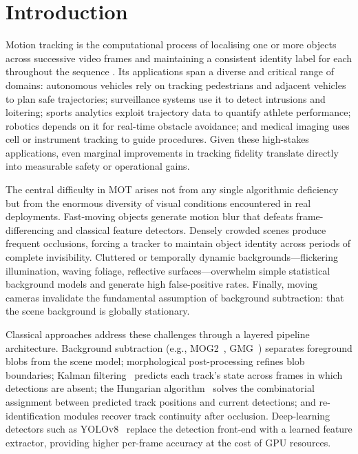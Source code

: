 \documentclass[10pt, conference, compsocconf]{IEEEtran}
\begin{document}
\section{Introduction}

Motion tracking is the computational process of localising one or
more objects across successive video frames and maintaining a
consistent identity label for each throughout the sequence
\cite{smeulders2014}. Its applications span a diverse and
critical range of domains: autonomous vehicles rely on tracking
pedestrians and adjacent vehicles to plan safe trajectories;
surveillance systems use it to detect intrusions and loitering;
sports analytics exploit trajectory data to quantify athlete
performance; robotics depends on it for real-time obstacle avoidance;
and medical imaging uses cell or instrument tracking to guide
procedures. Given these high-stakes applications, even marginal
improvements in tracking fidelity translate directly into measurable
safety or operational gains.

The central difficulty in MOT arises not from any single algorithmic
deficiency but from the enormous diversity of visual conditions
encountered in real deployments. Fast-moving objects generate motion
blur that defeats frame-differencing and classical feature detectors.
Densely crowded scenes produce frequent occlusions, forcing a tracker
to maintain object identity across periods of complete invisibility.
Cluttered or temporally dynamic backgrounds---flickering illumination,
waving foliage, reflective surfaces---overwhelm simple statistical
background models and generate high false-positive rates. Finally,
moving cameras invalidate the fundamental assumption of background
subtraction: that the scene background is globally stationary.

Classical approaches address these challenges through a layered
pipeline architecture. Background subtraction (e.g., MOG2~\cite{zivkovic2004},
GMG~\cite{godbehere2012}) separates foreground blobs from the scene
model; morphological post-processing refines blob boundaries; Kalman
filtering~\cite{kalman1960} predicts each track's state across frames
in which detections are absent; the Hungarian algorithm~\cite{kuhn1955}
solves the combinatorial assignment between predicted track positions
and current detections; and re-identification modules recover track
continuity after occlusion. Deep-learning detectors such as
YOLOv8~\cite{jocher2023} replace the detection front-end with a
learned feature extractor, providing higher per-frame accuracy at the
cost of GPU resources.
\end{document}
